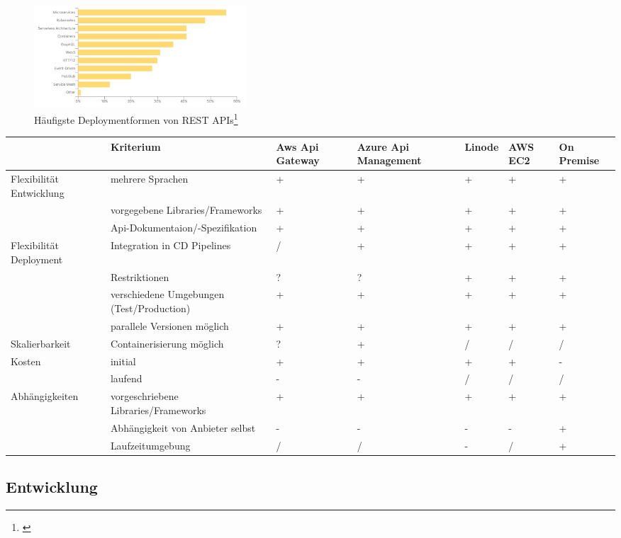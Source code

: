 \documentclass[notitlepage, hidelinks]{article}
\begin{document}
\begin{figure}[H]
\centering
  \includegraphics[width=300px]{images/stateofapideploymentcontainers.png}
  \caption{Häufigste Deploymentformen von REST APIs\protect\footnote{\cite{api-postman}}}
  \label{stateofapideploymentcontainers}
\end{figure}


\begin{tabular}{|L{2cm}|L{3.2cm}|L{1.5cm}|L{1.5cm}|L{1.5cm}|L{1.5cm}|L{1.5cm}|}
\hline
& Kriterium & Aws Api Gateway & Azure Api Management & Linode & AWS EC2 & On Premise \\ \hline
Flexibilität Entwicklung & mehrere Sprachen & + & + & + & + & + \\ 
& vorgegebene Libraries/Frameworks & + & + & + & + & + \\ 
& Api-Dokumentaion/-Spezifikation & + & + & + & + & + \\ \hline
Flexibilität Deployment & Integration in CD Pipelines & / & + & + & + & + \\ 
& Restriktionen & ? & ? & + & + & + \\ 
& verschiedene Umgebungen (Test/Production) & + & + & + & + & + \\ 
& parallele Versionen möglich & + & + & + & + & + \\ \hline
Skalierbarkeit & Containerisierung möglich & ? & + & / & / & / \\ 
Kosten & initial & + & + & + & + & - \\ 
& laufend & - & - & / & / & / \\ \hline
Abhängigkeiten & vorgeschriebene Libraries/Frameworks & + & + & + & + & + \\ 
& Abhängigkeit von Anbieter selbst & - & - & - & - & + \\ 
& Laufzeitumgebung & / & / & - & / & + \\ \hline
\end{tabular}

\subsection{Entwicklung}
\end{document}
